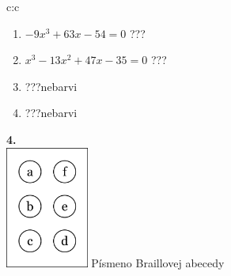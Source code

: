 \documentclass[10pt]{report}
\begin{document}
\begin{tabular}{c:c}
\begin{minipage}[c][99mm][t]{0.49\linewidth}
\begin{center}
\begin{minipage}{0.77\linewidth}
\begin{center}
\begin{varwidth}{\textwidth}
\begin{enumerate}
\item $-9x^3+63x-54=0$\quad \dotfill\; ???\;\dotfill {}
\item $x^3-13x^2+47x-35=0$\quad \dotfill\; ???\;\dotfill {}
\item \quad \dotfill\; ???\;\dotfill \quad nebarvi
\item \quad \dotfill\; ???\;\dotfill \quad nebarvi
\end{enumerate}
\end{varwidth}
\end{center}
\end{minipage}
\begin{minipage}{0.20\linewidth}
\begin{center}
{\Huge\bfseries 4.} \\[2mm]
\includegraphics[height=40mm]{../images/braille.png}
{\small Písmeno Braillovej abecedy}
\end{center}
\end{minipage}
\end{center}
\end{minipage}

\end{tabular}
\clearpage
\thispagestyle{empty}
\end{document}
